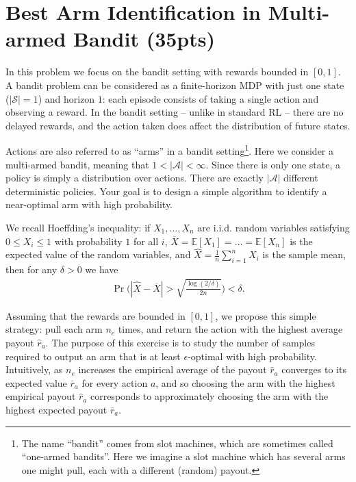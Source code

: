 \documentclass{article}
\newcommand{\E}{\mathbb{E}}
\begin{document}
\newpage

\section{Best Arm Identification in Multi-armed Bandit (35pts)}
In this problem we focus on the bandit setting with rewards bounded in $[0,1]$. A bandit problem can be considered as a finite-horizon MDP with just one state ($|\mathcal{S}| = 1$) and horizon $1$: each episode consists of taking a single action and observing a reward. In the bandit setting -- unlike in standard RL -- there are no delayed rewards, and the action taken does affect the distribution of future states.

Actions are also referred to as ``arms'' in a bandit setting\footnote{The name ``bandit'' comes from slot machines, which are sometimes called ``one-armed bandits''. Here we imagine a slot machine which has several arms one might pull, each with a different (random) payout.}. Here we consider a multi-armed bandit, meaning that $1 < |\mathcal{A}| < \infty$. Since there is only one state, a policy is simply a distribution over actions. There are exactly $|\mathcal{A}|$ different deterministic policies. Your goal is to design a simple algorithm to identify a near-optimal arm with high probability.

We recall Hoeffding's inequality: if $X_1,\dots,X_n$ are i.i.d. random variables satisfying $0 \le X_i \le 1$ with probability $1$ for all $i$, $\overline X = \E[X_1] = \dots = \E[X_n]$ is the expected value of the random variables, and $\widehat X = \frac{1}{n} \sum_{i=1}^n X_i$ is the sample mean, then for any $\delta > 0$ we have
\begin{align}
\Pr\Bigg(|\widehat X - \overline X | > \sqrt{\frac{\log(2/\delta)}{2n}}	\Bigg) < \delta.
\end{align}

Assuming that the rewards are bounded in $[0,1]$,
we propose this simple strategy: pull each arm $n_e$ times, and return the action with the highest average payout $\widehat r_a$. The purpose of this exercise is to study the number of samples required to output an arm that is at least $\epsilon$-optimal with high probability.
Intuitively, as $n_e$ increases the empirical average of the payout $\widehat r_a$ converges to its expected value $\overline r_a$ for every action $a$, and so choosing the arm with the highest empirical payout $\widehat r_a$ corresponds to approximately choosing the arm with the highest expected payout $\overline r_a$.
\end{document}

